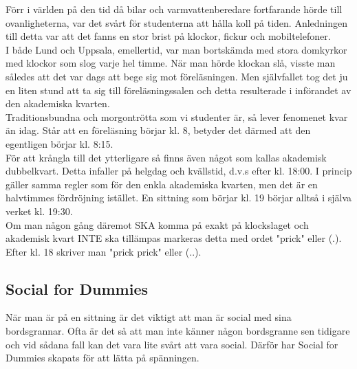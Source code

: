 {\fontsize{9}{9}\selectfont 
Förr i världen på den tid då bilar och varmvattenberedare
fortfarande hörde till ovanligheterna, var det svårt för studenterna 
att hålla koll på tiden. Anledningen till detta var att det fanns en
stor brist på klockor, fickur och mobiltelefoner.
\\

I både Lund och Uppsala, emellertid, var man bortskämda 
med stora domkyrkor med klockor som slog varje hel timme.
När man hörde klockan slå, visste man således att det var
dags att bege sig mot föreläsningen. Men självfallet tog det
ju en liten stund att ta sig till föreläsningssalen och detta
resulterade i införandet av den akademiska kvarten.
\\

Traditionsbundna och morgontrötta som vi studenter
är, så lever fenomenet kvar än idag. Står att en
föreläsning börjar kl. 8, betyder det därmed att den
egentligen börjar kl. 8:15.
\\

För att krångla till det ytterligare så finns även något 
som kallas akademisk dubbelkvart. Detta infaller på
helgdag och kvällstid, d.v.s efter kl. 18:00. I princip 
gäller samma regler som för den enkla akademiska kvarten,
men det är en halvtimmes fördröjning istället. En sittning
som börjar kl. 19 börjar alltså i själva verket kl. 19:30.
\\

Om man någon gång däremot SKA komma på
exakt på klockslaget och akademisk kvart
INTE ska tillämpas markeras detta med ordet "prick" eller (.).
Efter kl. 18 skriver man "prick prick" eller (..).
\\

\newpage


\subsection*{Social for Dummies}
När man är på en sittning är det viktigt att man är social med sina bordsgrannar. 
Ofta är det så att man inte känner någon bordsgranne sen tidigare och vid sådana 
fall kan det vara lite svårt att vara social. Därför har Social for Dummies 
skapats för att lätta på spänningen.
\\

}

